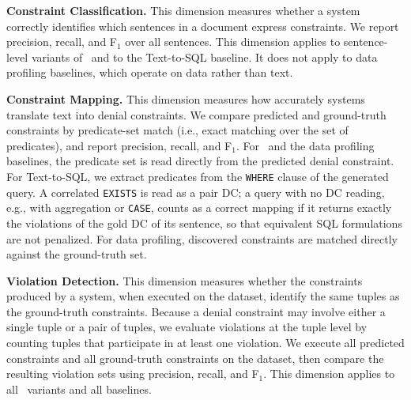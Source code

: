 \smallskip\noindent\textbf{Constraint Classification.}
This dimension measures whether a system correctly identifies which sentences
in a document express constraints. We report precision, recall, and F$_1$
over all sentences. This dimension applies to sentence-level variants of
\system\ and to the Text-to-SQL baseline. It does not apply to data profiling
baselines, which operate on data rather than text.

\smallskip\noindent\textbf{Constraint Mapping.}
This dimension measures how accurately systems translate text into denial
constraints. We compare predicted and ground-truth constraints by
predicate-set match (i.e., exact matching over the set of predicates), and report precision, recall, and F$_1$. For \system\
and the data profiling baselines, the predicate set is read directly from the
predicted denial constraint. For Text-to-SQL, we extract predicates from the
\texttt{WHERE} clause of the generated query. A correlated \texttt{EXISTS} is read as a pair DC; a query with no DC
reading, e.g., with aggregation or \texttt{CASE}, counts as a correct mapping
if it returns exactly the violations of the gold DC of its sentence, so that
equivalent SQL formulations are not penalized. For data profiling, discovered constraints are
matched directly against the ground-truth set.

\smallskip\noindent\textbf{Violation Detection.}
This dimension measures whether the constraints produced by a system, when
executed on the dataset, identify the same tuples as the
ground-truth constraints. Because a denial constraint may involve either a
single tuple or a pair of tuples, we evaluate violations at the tuple level by
counting tuples that participate in at least one violation. We execute all predicted
constraints and all ground-truth constraints on the dataset, then compare the
resulting violation sets using precision, recall, and F$_1$. This dimension
applies to all \system\ variants and all baselines.


